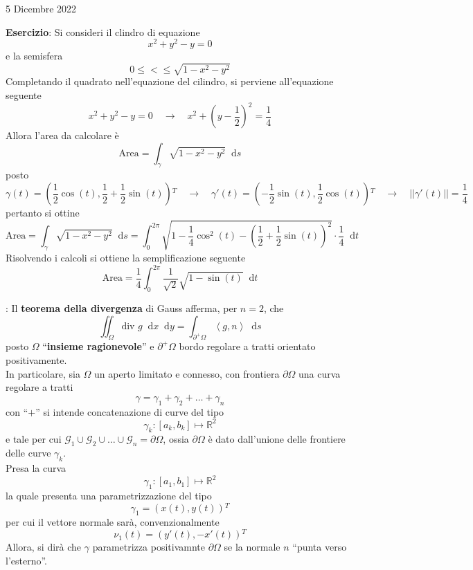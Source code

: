 \documentclass[a4paper]{extarticle}
\newcommand{\quotes}[1]{``#1''}
\newcommand*\dif{\mathop{}\!\mathrm{d}}
\begin{document}
\newpage
\noindent
\begin{center}
    5 Dicembre 2022
\end{center}
\vspace{1em}
\noindent
\textbf{Esercizio}: Si consideri il clindro di equazione
\[x^2+y^2-y=0\]
e la semisfera
\[0 \leq < \leq \sqrt{1-x^2-y^2}\]
Completando il quadrato nell'equazione del cilindro, si perviene all'equazione seguente
\[x^2+y^2-y=0 \hspace{1em} \rightarrow \hspace{1em} x^2+\left(y-\dfrac{1}{2}\right)^2=\dfrac{1}{4}\]
Allora l'area da calcolare è
\[\text{Area} = \int_\gamma \sqrt{1-x^2-y^2} \dif s\]
posto
\[\gamma(t) = \left(\dfrac{1}{2} \cos(t), \dfrac{1}{2} + \dfrac{1}{2} \sin(t)\right){^T} \hspace{1em} \rightarrow \hspace{1em} \gamma'(t) = \left(-\dfrac{1}{2} \sin(t), \dfrac{1}{2} \cos(t)\right){^T} \hspace{1em} \rightarrow \hspace{1em} \vert\vert \gamma'(t) \vert\vert=\dfrac{1}{4}\]
pertanto si ottine
\[\text{Area} = \int_\gamma \sqrt{1-x^2-y^2} \dif s = \int_0^{2\pi} \sqrt{1-\dfrac{1}{4} \cos^2(t) - \left(\dfrac{1}{2}+\dfrac{1}{2} \sin(t)\right)^2} \cdot \dfrac{1}{4} \dif t\]
Risolvendo i calcoli si ottiene la semplificazione seguente
\[\text{Area}=\dfrac{1}{4} \int_0^{2\pi} \dfrac{1}{\sqrt{2}} \sqrt{1-\sin(t)} \dif t\]

\vspace{2em}
\noindent
{}: Il \textbf{teorema della divergenza} di Gauss afferma, per $n=2$, che
\[\iint_\Omega \text{div } g \dif x \dif y = \int_{\partial^+ \Omega} \left<g,n\right> \dif s\]
posto $\Omega$ \quotes{\textbf{insieme ragionevole}} e $\partial^+ \Omega$ bordo regolare a tratti orientato positivamente.\\
In particolare, sia $\Omega$ un aperto limitato e connesso, con frontiera $\partial \Omega$ una curva regolare a tratti
\[\gamma = \gamma_1 + \gamma_2 + \dots + \gamma_n\]
con \quotes{$+$} si intende concatenazione di curve del tipo
\[\gamma_k : [a_k,b_k] \longmapsto \mathbb{R}^2\]
e tale per cui $\mathcal{G}_1 \cup \mathcal{G}_2 \cup \dots \cup \mathcal{G}_n = \partial \Omega$, ossia $\partial \Omega$ è dato dall'unione delle frontiere delle curve $\gamma_k$.\\
Presa la curva
\[\gamma_1 : [a_1,b_1] \longmapsto \mathbb{R}^2\]
la quale presenta una parametrizzazione del tipo
\[\gamma_1=\left(x(t),y(t)\right){^T}\]
per cui il vettore normale sarà, convenzionalmente
\[\nu_1 (t) = \left(y'(t),-x'(t)\right){^T}\]
Allora, si dirà che $\gamma$ parametrizza positivamnte $\partial \Omega$ se la normale $n$ \quotes{punta verso l'esterno}.
\end{document}
